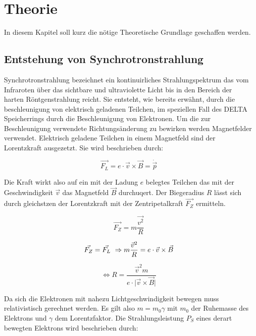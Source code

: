 \section{Theorie}
\label{sec:Theorie}
In diesem Kapitel soll kurz die nötige Theoretische Grundlage geschaffen werden.

\subsection{Entstehung von Synchrotronstrahlung}
\label{sec:Synchrotronstrahlung}
Synchrotronstrahlung bezeichnet ein kontinuirliches Strahlungspektrum das vom Infraroten über das 
sichtbare und ultraviolette Licht bis in den Bereich der harten Röntgenstrahlung reicht. Sie entsteht, 
wie bereits erwähnt, durch die beschleunigung von elektrisch geladenen Teilchen, im speziellen Fall des
DELTA Speicherrings durch die Beschleunigung von Elektronen. Um die zur Beschleunigung verwendete 
Richtungsänderung zu bewirken werden Magnetfelder verwendet. Elektrisch geladene Teilchen in einem 
Magnetfeld sind der Lorentzkraft ausgezetzt. Sie wird beschrieben durch:

\begin{equation*}
    \vec{F_L} = e \cdot \vec{v} \times \vec{B} = \dot{\vec{p}}
\end{equation*}

Die Kraft wirkt also auf ein mit der Ladung $e$ belegtes Teilchen das mit der Geschwindigkeit $\vec{v}$
das Magnetfeld $\vec{B}$ durchuqert. Der Biegeradius $R$ lässt sich durch gleichstzen der Lorentzkraft 
mit der Zentripetalkraft $\vec{F_Z}$ ermitteln. 

\begin{equation*}
    \vec{F_Z} = m \frac{\vec{v^2}}{R}
\end{equation*}

\begin{equation*}
    \vec{F_Z} = \vec{F_L} \\\
    \Rightarrow m \frac{\vec{v}^2}{R} = e \cdot \vec{v} \times \vec{B}\\\\
\end{equation*}

\begin{equation}
    \label{eq:Biegeradius}
    \Leftrightarrow R = \frac{\vec{v}^2 m}{e \cdot \lvert \vec{v} \times \vec{B} \rvert}
\end{equation}

Da sich die Elektronen mit nahezu Lichtgeschwindigkeit bewegen muss relativistisch gerechnet werden.
Es gilt also $m=m_0\gamma$ mit $m_0$ der Ruhemasse des Elektrons und $\gamma$ dem Lorentzfaktor.
Die Strahlungsleistung $P_S$ eines derart bewegten Elektrons wird beschrieben durch:

